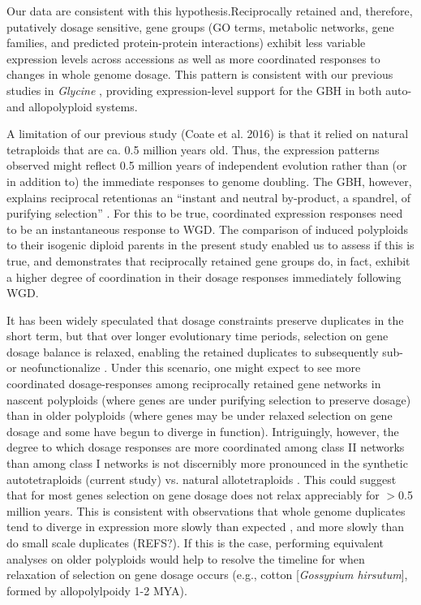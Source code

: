 \documentclass[11pt]{article}
\begin{document}
Our data are consistent with this hypothesis.Reciprocally retained and, therefore, putatively dosage sensitive, gene groups (GO terms, metabolic networks, gene families, and predicted protein-protein interactions) exhibit less variable expression levels across accessions as well as more coordinated responses to changes in whole genome dosage. This pattern is consistent with our previous studies in {\it Glycine} \citep{coate2016}, providing expression-level support for the GBH in both auto- and allopolyploid systems. 

A limitation of our previous study (Coate et al. 2016) is that it relied on natural tetraploids that are ca. 0.5 million years old. Thus, the expression patterns observed might reflect 0.5 million years of independent evolution rather than (or in addition to) the immediate responses to genome doubling. The GBH, however, explains  reciprocal retentionas an ``instant and neutral by-product, a spandrel, of purifying selection'' \citep{freeling2009}. For this to be true, coordinated expression responses need to be an instantaneous response to WGD. The comparison of induced polyploids to their isogenic diploid parents in the present study enabled us to assess if this is true, and demonstrates that reciprocally retained gene groups do, in fact, exhibit a higher degree of coordination in their dosage responses immediately following WGD. 

It has been widely speculated that dosage constraints preserve duplicates in the short term, but that over longer evolutionary time periods, selection on gene dosage balance is relaxed, enabling the retained duplicates to subsequently sub- or neofunctionalize \citep{coate2011, schnable2012, conant2014, coate2016}. Under this scenario, one might expect to see more coordinated dosage-responses among reciprocally retained gene networks in nascent polyploids (where genes are under purifying selection to preserve dosage) than in older polyploids (where genes may be under relaxed selection on gene dosage and some have begun to diverge in function). Intriguingly, however, the degree to which dosage responses are more coordinated among class II networks than among class I networks is not discernibly more pronounced in the synthetic autotetraploids (current study) vs. natural allotetraploids \citep{coate2016}. This could suggest that for most genes selection on gene dosage does not relax appreciably for $>$0.5 million years. This is consistent with observations that whole genome duplicates tend to diverge in expression more slowly than expected \citep{rodgers-melnick2012, tasdighian2017}, and more slowly than do small scale duplicates (REFS?). If this is the case, performing equivalent analyses on older polyploids would help to resolve the timeline for when relaxation of selection on gene dosage occurs (e.g., cotton [{\it Gossypium hirsutum}], formed by allopolylpoidy 1-2 MYA).
\end{document}
